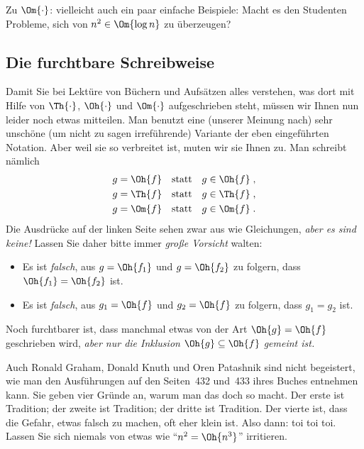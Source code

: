 \begin{tutorium}
  Zu $\Om{\cdot}$: vielleicht auch ein paar einfache Beispiele: Macht
  es den Studenten Probleme, sich von $n^2\in\Om{\log n}$ zu
  überzeugen?
\end{tutorium}


\Tut\subsection{Die furchtbare Schreibweise}
\label{subsec:O-furchbar}

Damit Sie bei Lektüre von Büchern und Aufsätzen alles verstehen, was
dort mit Hilfe von $\Th{\cdot}$, $\Oh{\cdot}$ und $\Om{\cdot}$
aufgeschrieben steht, müssen wir Ihnen nun leider noch etwas
mitteilen. Man benutzt eine (unserer Meinung nach) sehr unschöne (um
nicht zu sagen irreführende) Variante der eben eingeführten
Notation. Aber weil sie so verbreitet ist, muten wir sie Ihnen zu. Man
schreibt nämlich
%
\begin{align*}
  g = \Oh{f}  &\text{\quad statt\quad }  g \in \Oh{f} \;, \\
  g = \Th{f}  &\text{\quad statt\quad }  g \in \Th{f} \;, \\
  g = \Om{f}  &\text{\quad statt\quad }  g \in \Om{f} \;.
\end{align*}
%
Die Ausdrücke auf der linken Seite sehen zwar aus wie Gleichungen,
\emph{aber es sind keine!} Lassen Sie daher bitte immer \emph{große
  Vorsicht} walten: 
\begin{itemize}
\item Es ist \emph{falsch}, aus $g=\Oh{f_1}$ und
  $g=\Oh{f_2}$ zu folgern, dass $\Oh{f_1}=\Oh{f_2}$ ist.
\item Es ist \emph{falsch}, aus $g_1=\Oh{f}$ und
  $g_2=\Oh{f}$ zu folgern, dass $g_1=g_2$ ist.
\end{itemize}
%
Noch furchtbarer ist, dass manchmal etwas von der Art $\Oh{g}=\Oh{f}$
geschrieben wird, \emph{aber nur die Inklusion $\Oh{g}\subseteq
  \Oh{f}$ gemeint ist.}

Auch Ronald Graham, Donald Knuth und Oren Patashnik sind nicht
begeistert, wie man den Ausführungen auf den Seiten~432 und~433 ihres
Buches  \parencite{Graham_1989_CM_bk}
entnehmen kann. Sie geben vier Gründe an, warum man das doch so macht.
Der erste ist Tradition; der zweite ist Tradition; der dritte ist
Tradition. Der vierte ist, dass die Gefahr, etwas falsch zu machen,
oft eher klein ist. Also dann: toi toi toi. Lassen Sie sich niemals
von etwas wie "`$n^2=\Oh{n^3}$"' irritieren.

